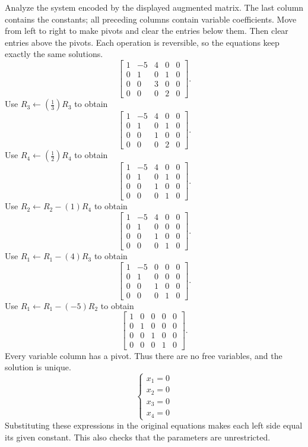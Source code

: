 \goal Analyze the system encoded by the displayed augmented matrix. The last column contains the constants; all preceding columns contain variable coefficients.
\idea Move from left to right to make pivots and clear the entries below them. Then clear entries above the pivots. Each operation is reversible, so the equations keep exactly the same solutions.
\[ \left[\begin{array}{rrrr|r}1&-5&4&0&0\\0&1&0&1&0\\0&0&3&0&0\\0&0&0&2&0\end{array}\right].\]
Use $R_{3}\leftarrow(\frac{1}{3})R_{3}$ to obtain
\[ \left[\begin{array}{rrrr|r}1&-5&4&0&0\\0&1&0&1&0\\0&0&1&0&0\\0&0&0&2&0\end{array}\right].\]
Use $R_{4}\leftarrow(\frac{1}{2})R_{4}$ to obtain
\[ \left[\begin{array}{rrrr|r}1&-5&4&0&0\\0&1&0&1&0\\0&0&1&0&0\\0&0&0&1&0\end{array}\right].\]
Use $R_{2}\leftarrow R_{2}-(1)R_{4}$ to obtain
\[ \left[\begin{array}{rrrr|r}1&-5&4&0&0\\0&1&0&0&0\\0&0&1&0&0\\0&0&0&1&0\end{array}\right].\]
Use $R_{1}\leftarrow R_{1}-(4)R_{3}$ to obtain
\[ \left[\begin{array}{rrrr|r}1&-5&0&0&0\\0&1&0&0&0\\0&0&1&0&0\\0&0&0&1&0\end{array}\right].\]
Use $R_{1}\leftarrow R_{1}-(-5)R_{2}$ to obtain
\[ \left[\begin{array}{rrrr|r}1&0&0&0&0\\0&1&0&0&0\\0&0&1&0&0\\0&0&0&1&0\end{array}\right].\]
Every variable column has a pivot. Thus there are no free variables, and the solution is unique.
\[ \begin{cases}x_{1}=0\\x_{2}=0\\x_{3}=0\\x_{4}=0\end{cases}\]
Substituting these expressions in the original equations makes each left side equal its given constant. This also checks that the parameters are unrestricted.

